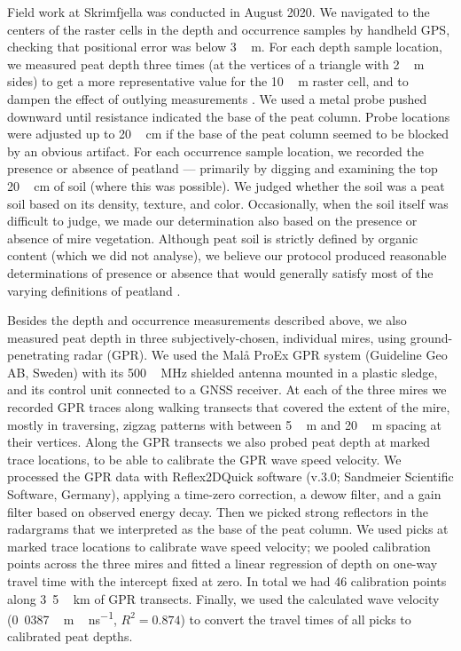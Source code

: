 \documentclass[soil, manuscript]{copernicus}
\begin{document}
Field work at Skrimfjella was conducted in August 2020.
We navigated to the centers of the raster cells in the depth and occurrence samples by handheld GPS, checking that positional error was below \unit{3\,m}.
For each depth sample location, we measured peat depth three times (at the vertices of a triangle with \unit{2\,m} sides) to get a more representative value for the \unit{10\,m} raster cell, and to dampen the effect of outlying measurements \citep{parryEvaluatingApproachesEstimating2014}.
We used a metal probe pushed downward until resistance indicated the base of the peat column.
Probe locations were adjusted up to \unit{20\,cm} if the base of the peat column seemed to be blocked by an obvious artifact.
For each occurrence sample location, we recorded the presence or absence of peatland --- primarily by digging and examining the top \unit{20\,cm} of soil (where this was possible).
We judged whether the soil was a peat soil based on its density, texture, and color.
Occasionally, when the soil itself was difficult to judge, we made our determination also based on the presence or absence of mire vegetation.
Although peat soil is strictly defined by organic content (which we did not analyse), we believe our protocol produced reasonable determinations of presence or absence that would generally satisfy most of the varying definitions of peatland \citep{minasnyMappingMonitoringPeatland2023}.

Besides the depth and occurrence measurements described above, we also measured peat depth in three subjectively-chosen, individual mires, using ground-penetrating radar (GPR).
We used the Malå ProEx GPR system (Guideline Geo AB, Sweden) with its \unit{500\,MHz} shielded antenna mounted in a plastic sledge, and its control unit connected to a GNSS receiver.
At each of the three mires we recorded GPR traces along walking transects that covered the extent of the mire, mostly in traversing, zigzag patterns with between \unit{5\,m} and \unit{20\,m} spacing at their vertices.
Along the GPR transects we also probed peat depth at marked trace locations, to be able to calibrate the GPR wave speed velocity.
We processed the GPR data with Reflex2DQuick software (v.3.0; Sandmeier Scientific Software, Germany), applying a time-zero correction, a dewow filter, and a gain filter based on observed energy decay.
Then we picked strong reflectors in the radargrams that we interpreted as the base of the peat column.
We used picks at marked trace locations to calibrate wave speed velocity; we pooled calibration points across the three mires and fitted a linear regression of depth on one-way travel time with the intercept fixed at zero.
In total we had 46 calibration points along \unit{3.5\,km} of GPR transects.
Finally, we used the calculated wave velocity (\unit{0.0387\,m\,ns^{-1}}, \(R^2 = 0.874\)) to convert the travel times of all picks to calibrated peat depths.
\end{document}
